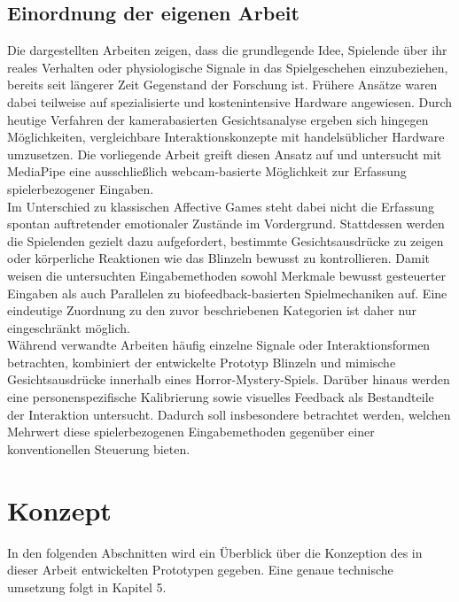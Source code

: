 \documentclass[intern]{cgMA}
\begin{document}
\subsection{Einordnung der eigenen Arbeit}
Die dargestellten Arbeiten zeigen, dass die grundlegende Idee, Spielende über ihr reales Verhalten oder physiologische Signale in das Spielgeschehen einzubeziehen, bereits seit längerer Zeit Gegenstand der Forschung ist. Frühere Ansätze waren dabei teilweise auf spezialisierte und kostenintensive Hardware angewiesen. Durch heutige Verfahren der kamerabasierten Gesichtsanalyse ergeben sich hingegen Möglichkeiten, vergleichbare Interaktionskonzepte mit handelsüblicher Hardware umzusetzen. Die vorliegende Arbeit greift diesen Ansatz auf und untersucht mit MediaPipe eine ausschließlich webcam-basierte Möglichkeit zur Erfassung spielerbezogener Eingaben.\\
Im Unterschied zu klassischen Affective Games steht dabei nicht die Erfassung spontan auftretender emotionaler Zustände im Vordergrund. Stattdessen werden die Spielenden gezielt dazu aufgefordert, bestimmte Gesichtsausdrücke zu zeigen oder körperliche Reaktionen wie das Blinzeln bewusst zu kontrollieren. Damit weisen die untersuchten Eingabemethoden sowohl Merkmale bewusst gesteuerter Eingaben als auch Parallelen zu biofeedback-basierten Spielmechaniken auf. Eine eindeutige Zuordnung zu den zuvor beschriebenen Kategorien ist daher nur eingeschränkt möglich.\\
Während verwandte Arbeiten häufig einzelne Signale oder Interaktionsformen betrachten, kombiniert der entwickelte Prototyp Blinzeln und mimische Gesichtsausdrücke innerhalb eines Horror-Mystery-Spiels. Darüber hinaus werden eine personenspezifische Kalibrierung sowie visuelles Feedback als Bestandteile der Interaktion untersucht. Dadurch soll insbesondere betrachtet werden, welchen Mehrwert diese spielerbezogenen Eingabemethoden gegenüber einer konventionellen Steuerung bieten.
\section{Konzept}
In den folgenden Abschnitten wird ein Überblick über die Konzeption des in dieser Arbeit entwickelten Prototypen gegeben. Eine genaue technische umsetzung folgt in Kapitel 5.
\end{document}
